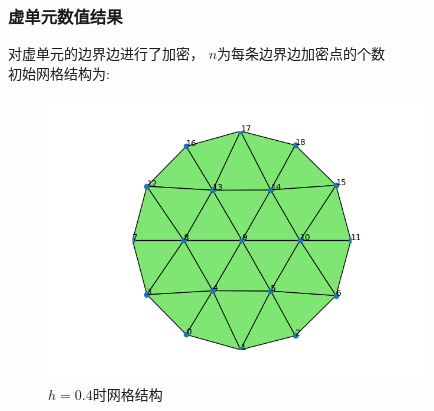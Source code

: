 \documentclass[12pt]{article}
\begin{document}
\begin{CJK}{UTF8}{gkai}
        \subsubsection{虚单元数值结果}
        
        对虚单元的边界边进行了加密， $n$为每条边界边加密点的个数\\
        
        初始网格结构为:\\
        \begin{figure}[H] 
        	\centering
        	\includegraphics[width=10cm]{0.png}
        	\caption{$h=0.4$时网格结构}
        \end{figure}
        

\end{CJK}
\end{document}
